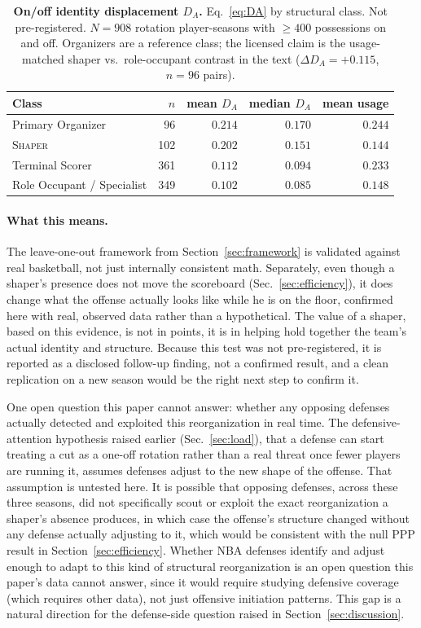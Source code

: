 \documentclass[11pt]{article}
\begin{document}
\begin{table}[h!]
\centering\small
\caption{\textbf{On/off identity displacement $D_A$.} Eq.~\ref{eq:DA} by structural class.
Not pre-registered. $N=908$ rotation player-seasons with $\ge 400$ possessions on and off.
Organizers are a reference class; the licensed claim is the usage-matched
shaper vs.\ role-occupant contrast in the text ($\Delta D_A=+0.115$, $n=96$ pairs).}
\label{tab:identity-resilience}
\begin{tabular}{lrrrr}
\toprule
Class & $n$ & mean $D_A$ & median $D_A$ & mean usage \\
\midrule
Primary Organizer & 96 & $0.214$ & $0.170$ & $0.244$ \\
\textsc{Shaper} & 102 & $0.202$ & $0.151$ & $0.144$ \\
Terminal Scorer & 361 & $0.112$ & $0.094$ & $0.233$ \\
Role Occupant / Specialist & 349 & $0.102$ & $0.085$ & $0.148$ \\
\bottomrule
\end{tabular}
\end{table}

\paragraph{What this means.}
The leave-one-out framework from Section~\ref{sec:framework} is validated against real
basketball, not just internally consistent math. Separately, even though a shaper's presence
does not move the scoreboard (Sec.~\ref{sec:efficiency}), it does change what the offense
actually looks like while he is on the floor, confirmed here with real, observed data
rather than a hypothetical. The value of a shaper, based on this evidence, is not in
points, it is in helping hold together the team's actual identity and structure. Because
this test was not pre-registered, it is reported as a disclosed follow-up finding, not a
confirmed result, and a clean replication on a new season would be the right next step to
confirm it.

One open question this paper cannot answer: whether any opposing defenses actually detected
and exploited this reorganization in real time. The defensive-attention hypothesis raised
earlier (Sec.~\ref{sec:load}), that a defense can start treating a cut as a one-off rotation
rather than a real threat once fewer players are running it, assumes defenses adjust to the
new shape of the offense. That assumption is untested here. It is possible that opposing
defenses, across these three seasons, did not specifically scout or exploit the exact
reorganization a shaper's absence produces, in which case the offense's structure changed
without any defense actually adjusting to it, which would be consistent with the null PPP
result in Section~\ref{sec:efficiency}. Whether NBA defenses identify and adjust enough to
adapt to this kind of structural reorganization is an open question this paper's data cannot
answer, since it would require studying defensive coverage (which requires other data), not
just offensive initiation patterns. This gap is a natural direction for the defense-side
question raised in Section~\ref{sec:discussion}.
\end{document}
